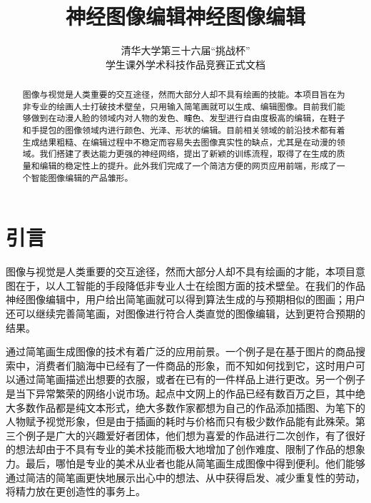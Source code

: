 \documentclass[a4paper,12pt,UTF8]{ctexart}
\title{神经图像编辑}
\begin{document}
\pagestyle{fancy}
\lhead{}
\rhead{}

\title{{\Huge 神经图像编辑}}
\author{\Large 清华大学第三十六届``挑战杯'' \\ \Large 学生课外学术科技作品竞赛正式文档}
\date{}
\maketitle

\newpage
\tableofcontents
\newpage

\begin{abstract}

图像与视觉是人类重要的交互途径，然而大部分人却不具有绘画的技能。本项目旨在为非专业的绘画人士打破技术壁垒，只用输入简笔画就可以生成、编辑图像。目前我们能够做到在动漫人脸的领域内对人物的发色、瞳色、发型进行自由度极高的编辑，在鞋子和手提包的图像领域内进行颜色、光泽、形状的编辑。目前相关领域的前沿技术都有着生成结果粗糙、在编辑过程中不稳定而容易失去图像真实性的缺点，尤其是在动漫的领域。我们搭建了表达能力更强的神经网络，提出了新颖的训练流程，取得了在生成的质量和编辑的稳定性上的提升。此外我们完成了一个简洁方便的网页应用前端，形成了一个智能图像编辑的产品雏形。

\end{abstract}

\section{引言}

图像与视觉是人类重要的交互途径，然而大部分人却不具有绘画的才能，本项目意图在于，以人工智能的手段降低非专业人士在绘图方面的技术壁垒。在我们的作品神经图像编辑中，用户给出简笔画就可以得到算法生成的与预期相似的图画；用户还可以继续完善简笔画，对图像进行符合人类直觉的图像编辑，达到更符合预期的结果。

通过简笔画生成图像的技术有着广泛的应用前景。一个例子是在基于图片的商品搜索中，消费者们脑海中已经有了一件商品的形象，而不知如何找到它，这时用户可以通过简笔画描述出想要的衣服，或者在已有的一件样品上进行更改。另一个例子是当下异常繁荣的网络小说市场。起点中文网上的作品已经有数百万之巨，其中绝大多数作品都是纯文本形式，绝大多数作家都想为自己的作品添加插图、为笔下的人物赋予视觉形象，但是由于插画的耗时与价格而只有极少数作品能有此殊荣。第三个例子是广大的兴趣爱好者团体，他们想为喜爱的作品进行二次创作，有了很好的想法却由于不具有专业的美术技能而极大地增加了创作难度、限制了作品的想象力。最后，哪怕是专业的美术从业者也能从简笔画生成图像中得到便利。他们能够通过简洁的简笔画更快地展示出心中的想法、从中获得启发、减少重复性的劳动，将精力放在更创造性的事务上。
\end{document}
